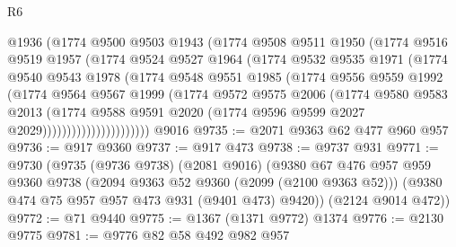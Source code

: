 \begin{lexlean}{R6}
\begin{coremodule}
                      @1936
                      (@1774
                        @9500
                        @9503
                        @1943
                        (@1774
                          @9508
                          @9511
                          @1950
                          (@1774
                            @9516
                            @9519
                            @1957
                            (@1774
                              @9524
                              @9527
                              @1964
                              (@1774
                                @9532
                                @9535
                                @1971
                                (@1774
                                  @9540
                                  @9543
                                  @1978
                                  (@1774
                                    @9548
                                    @9551
                                    @1985
                                    (@1774
                                      @9556
                                      @9559
                                      @1992
                                      (@1774
                                        @9564
                                        @9567
                                        @1999
                                        (@1774
                                          @9572
                                          @9575
                                          @2006
                                          (@1774
                                            @9580
                                            @9583
                                            @2013
                                            (@1774
                                              @9588
                                              @9591
                                              @2020
                                              (@1774 @9596 @9599 @2027 @2029))))))))))))))))))))))
    @9016
@9735 := @2071 @9363 @62 @477 @960 @957
@9736 := @917 @9360
@9737 := @917 @473
@9738 := @9737 @931
@9771 := @9730
    (@9735
      (@9736 @9738)
      (@2081 @9016)
      (@9380
        @67
        @476
        @957
        @959
        @9360
        @9738
        (@2094 @9363 @52 @9360 (@2099 (@2100 @9363 @52)))
        (@9380 @474 @75 @957 @957 @473 @931 (@9401 @473) @9420))
      (@2124 @9014 @472))
@9772 := @71 @9440
@9775 := @1367 (@1371 @9772) @1374
@9776 := @2130 @9775
@9781 := @9776 @82 @58 @492 @982 @957

\end{coremodule}
\end{lexlean}

